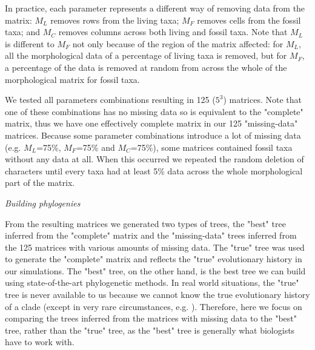 \documentclass[12pt,letterpaper]{article}
\renewcommand{\subsection}[1]{%
\bigskip
\begin{center}
\begin{large}
\normalfont\itshape #1
\end{large}
\end{center}}
\begin{document}
In practice, each parameter represents a different way of removing data from the matrix: $M_{L}$ removes rows from the living taxa; $M_{F}$ removes cells from the fossil taxa; and $M_{C}$ removes columns across both living and fossil taxa. Note that $M_{L}$ is different to $M_{F}$ not only because of the region of the matrix affected: for $M_{L}$, all the morphological data of a percentage of living taxa is removed, but for $M_{F}$, a percentage of the data is removed at random from across the whole of the morphological matrix for fossil taxa.

We tested all parameters combinations resulting in 125 ($5^3$) matrices. Note that one of these combinations has no missing data so is equivalent to the "complete" matrix, thus we have one effectively complete matrix in our 125 "missing-data" matrices. Because some parameter combinations introduce a lot of missing data (e.g. $M_L$=75\%, $M_F$=75\% and $M_C$=75\%), some matrices contained fossil taxa without any data at all. When this occurred we repeated the random deletion of characters until every taxa had at least 5\% data across the whole morphological part of the matrix.


\subsection{Building phylogenies}
From the resulting matrices we generated two types of trees, the "best" tree inferred from the "complete" matrix and the "missing-data" trees inferred from the 125 matrices with various amounts of missing data. The "true" tree was used to generate the "complete" matrix and reflects the "true" evolutionary history in our simulations. The "best" tree, on the other hand, is the best tree we can build using state-of-the-art phylogenetic methods. In real world situations, the "true" tree is never available to us because we cannot know the true evolutionary history of a clade (except in very rare circumstances, e.g. \citealt{rozen2005}). Therefore, here we focus on comparing the trees inferred from the matrices with missing data to the "best" tree, rather than the "true" tree, as the "best" tree is generally what biologists have to work with.
\end{document}

